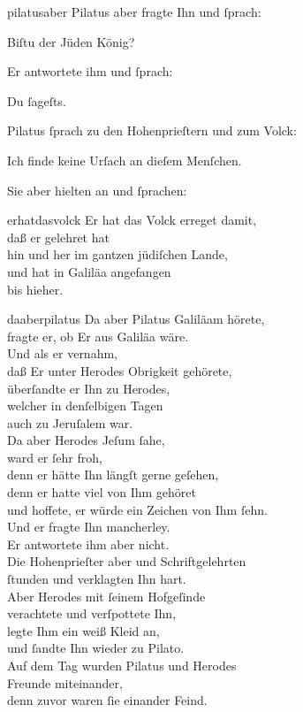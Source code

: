 \documentclass[tocstyle=ref-genre]{ees}
\begin{document}
{\begin{movement}{pilatusaber}
  \voice[Evangelist]
  Pilatus aber fragte Ihn und ſprach:

  \voice[Pilatus]
  Biſtu der Jüden König?

  \voice[Evangelist]
  Er antwortete ihm und ſprach:

  \voice[Jesus]
  Du ſageſts.

  \voice[Evangelist]
  Pilatus ſprach zu den Hohenprieſtern und zum Volck:

  \voice[Pilatus]
  Ich finde keine Urſach an dieſem Menſchen.

  \voice[Evangelist]
  Sie aber hielten an und ſprachen:
\end{movement}

\begin{movement}{erhatdasvolck}
  \voice[Chor]
  Er hat das Volck erreget damit,\\
  daß er gelehret hat\\
  hin und her im gantzen jüdiſchen Lande,\\
  und hat in Galiläa angefangen\\
  bis hieher.
\end{movement}

\begin{movement}{daaberpilatus}
  \voice[Evangelist]
  Da aber Pilatus Galiläam hörete,\\
  fragte er, ob Er aus Galiläa wäre.\\
  Und als er vernahm,\\
  daß Er unter Herodes Obrigkeit gehörete,\\
  überſandte er Ihn zu Herodes,\\
  welcher in denſelbigen Tagen\\
  auch zu Jeruſalem war.\\
  Da aber Herodes Jeſum ſahe,\\
  ward er ſehr froh,\\
  denn er hätte Ihn längſt gerne geſehen,\\
  denn er hatte viel von Ihm gehöret\\
  und hoffete, er würde ein Zeichen von Ihm ſehn.\\
  Und er fragte Ihn mancherley.\\
  Er antwortete ihm aber nicht.\\
  Die Hohenprieſter aber und Schriftgelehrten\\
  ſtunden und verklagten Ihn hart.\\
  Aber Herodes mit ſeinem Hofgeſinde\\
  verachtete und verſpottete Ihn,\\
  legte Ihm ein weiß Kleid an,\\
  und ſandte Ihn wieder zu Pilato.\\
  Auf dem Tag wurden Pilatus und Herodes\\
  Freunde miteinander,\\
  denn zuvor waren ſie einander Feind.
\end{movement}

}
\end{document}
